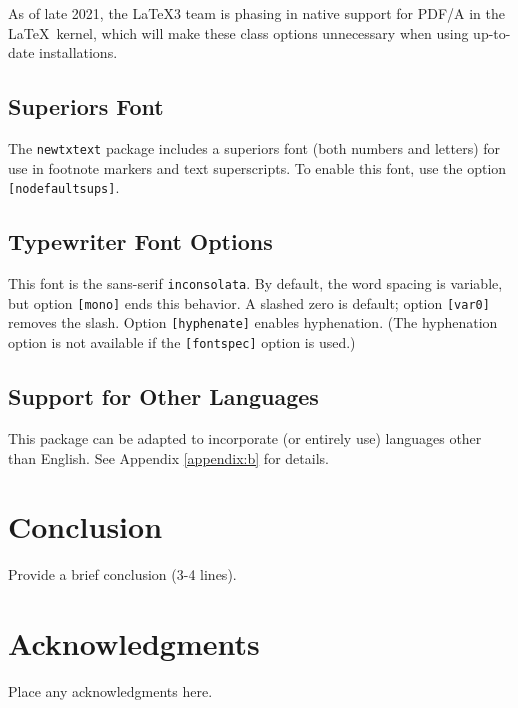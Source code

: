 \documentclass[grid,balance,upint,subscriptcorrection,varvw,mathalfa=cal=euler,spanish,french,greek,russian,vietnamese,colorlinks]{asmeconf}
\begin{document}
As of late 2021, the \LaTeX 3 team is phasing in native support for PDF/A in the \LaTeX\ kernel, which will make these
class options unnecessary when using up-to-date installations.

\subsection{Superiors Font} The \texttt{newtxtext} package includes a superiors font (both numbers and letters) for use in footnote markers and text superscripts. To enable this font, use the option \texttt{[nodefaultsups]}. 

\subsection{Typewriter Font Options} This font is the sans-serif \texttt{inconsolata}. By default, the word spacing is variable, but option \texttt{[mono]} ends this behavior. A slashed zero is default; option \texttt{[var0]} removes the slash. Option \texttt{[hyphenate]} enables hyphenation. (The hyphenation option is not available if the \texttt{[fontspec]} option is used.)

\subsection{Support for Other Languages}  This package can be adapted to incorporate (or entirely use) languages other than English. See Appendix \ref{appendix:b} for details.



\section{Conclusion}
Provide a brief conclusion (3-4 lines).



\section*{Acknowledgments}
Place any acknowledgments here.


\end{document}
